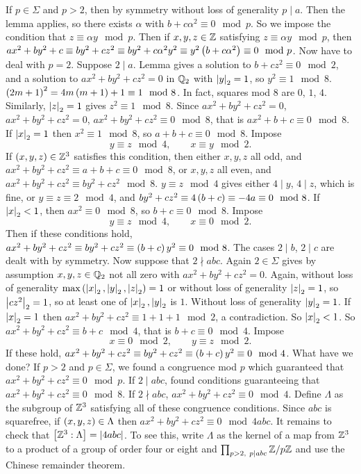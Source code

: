 If $ p \in \Sigma $ and $ p > 2 $, then by symmetry without loss of generality $ p \mid a $. Then the lemma applies, so there exists $ \alpha $ with $ b + c\alpha^2 \equiv 0 \mod p $. So we impose the condition that $ z \equiv \alpha y \mod p $. Then if $ x, y, z \in \mathbb{Z} $ satisfying $ z \equiv \alpha y \mod p $, then $ ax^2 + by^2 + c \equiv by^2 + cz^2 \equiv by^2 + c\alpha^2y^2 \equiv y^2\left( b + c\alpha^2 \right) \equiv 0 \mod p $. Now have to deal with $ p = 2 $. Suppose $ 2 \mid a $. Lemma gives a solution to $ b + cz^2 \equiv 0 \mod 2 $, and a solution to $ ax^2 + by^2 + cz^2 = 0 $ in $ \mathbb{Q}_2 $ with $ \left\lvert y \right\rvert_2 = 1 $, so $ y^2 \equiv 1 \mod 8 $. $ \left( 2m + 1 \right)^2 = 4m\left( m + 1 \right) + 1 \equiv 1 \mod 8 $. In fact, squares mod $ 8 $ are $ 0 $, $ 1 $, $ 4 $. Similarly, $ \left\lvert z \right\rvert_2 = 1 $ gives $ z^2 \equiv 1 \mod 8 $. Since $ ax^2 + by^2 + cz^2 = 0 $, $ ax^2 + by^2 + cz^2 = 0 $, $ ax^2 + by^2 + cz^2 \equiv 0 \mod 8 $, that is $ ax^2 + b + c \equiv 0 \mod 8 $. If $ \left\lvert x \right\rvert_2 = 1 $ then $ x^2 \equiv 1 \mod 8 $, so $ a + b + c \equiv 0 \mod 8 $. Impose
$$ y \equiv z \mod 4, \qquad x \equiv y \mod 2. $$
If $ \left( x, y, z \right) \in \mathbb{Z}^3 $ satisfies this condition, then either $ x, y, z $ all odd, and $ ax^2 + by^2 + cz^2 \equiv a + b + c \equiv 0 \mod 8 $, or $ x, y, z $ all even, and $ ax^2 + by^2 + cz^2 \equiv by^2 + cz^2 \mod 8 $. $ y \equiv z \mod 4 $ gives either $ 4 \mid y $, $ 4 \mid z $, which is fine, or $ y \equiv z \equiv 2 \mod 4 $, and $ by^2 + cz^2 \equiv 4\left( b + c \right) \equiv -4a \equiv 0 \mod 8 $. If $ \left\lvert x \right\rvert_2 < 1 $, then $ ax^2 \equiv 0 \mod 8 $, so $ b + c \equiv 0 \mod 8 $. Impose
$$ y \equiv z \mod 4, \qquad x \equiv 0 \mod 2. $$
Then if these conditions hold, $ ax^2 + by^2 + cz^2 \equiv by^2 + cz^2 \equiv \left( b + c \right)y^2 \equiv 0 \mod 8 $. The cases $ 2 \mid b $, $ 2 \mid c $ are dealt with by symmetry. Now suppose that $ 2 \nmid abc $. Again $ 2 \in \Sigma $ gives by assumption $ x, y, z \in \mathbb{Q}_2 $ not all zero with $ ax^2 + by^2 + cz^2 = 0 $. Again, without loss of generality $ \max\left( \left\lvert x \right\rvert_2, \left\lvert y \right\rvert_2, \left\lvert z \right\rvert_2 \right) = 1 $ or without loss of generality $ \left\lvert z \right\rvert_2 = 1 $, so $ \left\lvert cz^2 \right\rvert_2 = 1 $, so at least one of $ \left\lvert x \right\rvert_2, \left\lvert y \right\rvert_2 $ is $ 1 $. Without loss of generality $ \left\lvert y \right\rvert_2 = 1 $. If $ \left\lvert x \right\rvert_2 = 1 $ then $ ax^2 + by^2 + cz^2 \equiv 1 + 1 + 1 \mod 2 $, a contradiction. So $ \left\lvert x \right\rvert_2 < 1 $. So $ ax^2 + by^2 + cz^2 \equiv b + c \mod 4 $, that is $ b + c \equiv 0 \mod 4 $. Impose
$$ x \equiv 0 \mod 2, \qquad y \equiv z \mod 2. $$
If these hold, $ ax^2 + by^2 + cz^2 \equiv by^2 + cz^2 \equiv \left( b + c \right)y^2 \equiv 0 \mod 4 $. What have we done? If $ p > 2 $ and $ p \in \Sigma $, we found a congruence mod $ p $ which guaranteed that $ ax^2 + by^2 + cz^2 \equiv 0 \mod p $. If $ 2 \mid abc $, found conditions guaranteeing that $ ax^2 + by^2 + cz^2 \equiv 0 \mod 8 $. If $ 2 \nmid abc $, $ ax^2 + by^2 + cz^2 \equiv 0 \mod 4 $. Define $ \Lambda $ as the subgroup of $ \mathbb{Z}^3 $ satisfying all of these congruence conditions. Since $ abc $ is squarefree, if $ \left( x, y, z \right) \in \Lambda $ then $ ax^2 + by^2 + cz^2 \equiv 0 \mod 4abc $. It remains to check that $ \left[ \mathbb{Z}^3 : \Lambda \right] = \left\lvert 4abc \right\rvert $. To see this, write $ \Lambda $ as the kernel of a map from $ \mathbb{Z}^3 $ to a product of a group of order four or eight and $ \prod_{p > 2, \ p \mid abc} \mathbb{Z} / p\mathbb{Z} $ and use the Chinese remainder theorem.


